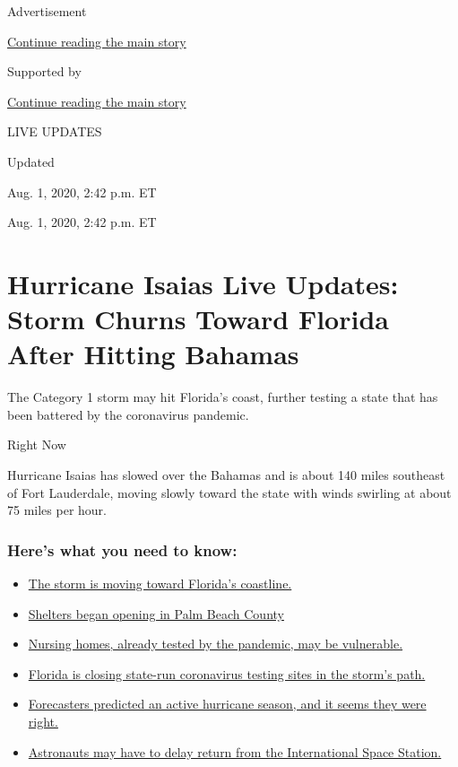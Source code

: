 Advertisement

\protect\hyperlink{after-top}{Continue reading the main story}

Supported by

\protect\hyperlink{after-sponsor}{Continue reading the main story}

LIVE UPDATES

Updated~

Aug. 1, 2020, 2:42 p.m. ET

Aug. 1, 2020, 2:42 p.m. ET

\hypertarget{hurricane-isaias-live-updates-storm-churns-toward-florida-after-hitting-bahamas}{%
\section{Hurricane Isaias Live Updates: Storm Churns Toward Florida
After Hitting
Bahamas}\label{hurricane-isaias-live-updates-storm-churns-toward-florida-after-hitting-bahamas}}

The Category 1 storm may hit Florida's coast, further testing a state
that has been battered by the coronavirus pandemic.

Right Now

Hurricane Isaias has slowed over the Bahamas and is about 140 miles
southeast of Fort Lauderdale, moving slowly toward the state with winds
swirling at about 75 miles per hour.

\hypertarget{heres-what-you-need-to-know}{%
\subsubsection{Here's what you need to
know:}\label{heres-what-you-need-to-know}}

\begin{itemize}
\tightlist
\item
  \protect\hyperlink{link-1cd8e207}{The storm is moving toward Florida's
  coastline.}
\item
  \protect\hyperlink{link-45d987d2}{Shelters began opening in Palm Beach
  County}
\item
  \protect\hyperlink{link-1257f12e}{Nursing homes, already tested by the
  pandemic, may be vulnerable.}
\item
  \protect\hyperlink{link-65b0758c}{Florida is closing state-run
  coronavirus testing sites in the storm's path.}
\item
  \protect\hyperlink{link-41916cd2}{Forecasters predicted an active
  hurricane season, and it seems they were right.}
\item
  \protect\hyperlink{link-4b87d643}{Astronauts may have to delay return
  from the International Space Station.}
\end{itemize}

